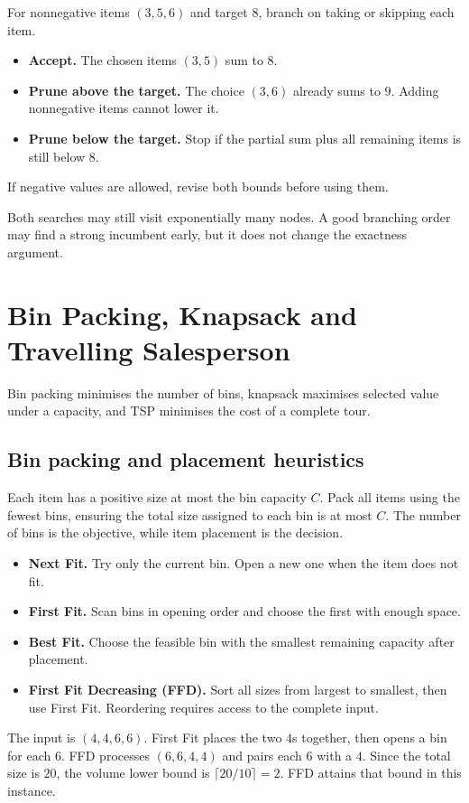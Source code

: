 \documentclass[12pt,a4paper]{article}
\begin{document}
\begin{tcolorbox}[examplebox, title={Backtracking for subset sum}]
For nonnegative items $(3,5,6)$ and target $8$, branch on taking or skipping each item.
\begin{itemize}[leftmargin=*, itemsep=2pt]
  \item \textbf{Accept.} The chosen items $(3,5)$ sum to $8$.
  \item \textbf{Prune above the target.} The choice $(3,6)$ already sums to $9$. Adding nonnegative items cannot lower it.
  \item \textbf{Prune below the target.} Stop if the partial sum plus all remaining items is still below $8$.
\end{itemize}
If negative values are allowed, revise both bounds before using them.
\end{tcolorbox}

Both searches may still visit exponentially many nodes. A good branching order may find a strong incumbent early, but it does not change the exactness argument.

\section{Bin Packing, Knapsack and Travelling Salesperson}
Bin packing minimises the number of bins, knapsack maximises selected value under a capacity, and TSP minimises the cost of a complete tour.
\subsection{Bin packing and placement heuristics}
\begin{tcolorbox}[defbox, title={One-dimensional bin packing}]
Each item has a positive size at most the bin capacity $C$. Pack all items using the fewest bins, ensuring the total size assigned to each bin is at most $C$. The number of bins is the objective, while item placement is the decision.
\end{tcolorbox}

\begin{itemize}[leftmargin=*, itemsep=3pt, topsep=4pt]
  \item \textbf{Next Fit.} Try only the current bin. Open a new one when the item does not fit.
  \item \textbf{First Fit.} Scan bins in opening order and choose the first with enough space.
  \item \textbf{Best Fit.} Choose the feasible bin with the smallest remaining capacity after placement.
  \item \textbf{First Fit Decreasing (FFD).} Sort all sizes from largest to smallest, then use First Fit. Reordering requires access to the complete input.
\end{itemize}
\begin{tcolorbox}[examplebox, title={Trace and optimality check with capacity 10}]
The input is $(4,4,6,6)$. First Fit places the two $4$s together, then opens a bin for each $6$. FFD processes $(6,6,4,4)$ and pairs each $6$ with a $4$. Since the total size is $20$, the volume lower bound is $\lceil20/10\rceil=2$. FFD attains that bound in this instance.
\end{tcolorbox}
\end{document}
